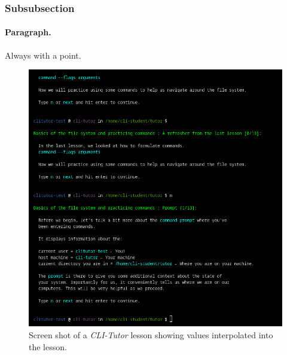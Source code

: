 \subsubsection{Subsubsection}

\paragraph{Paragraph.} Always with a point.


\begin{figure}[htbp]
	\centering
	\includegraphics[width=1\textwidth]{img/cliexpansionfull}
	\caption{Screen shot of a \textit{CLI-Tutor} lesson showing values interpolated into the lesson.}
	\label{fig:templateexpansion}
\end{figure}
